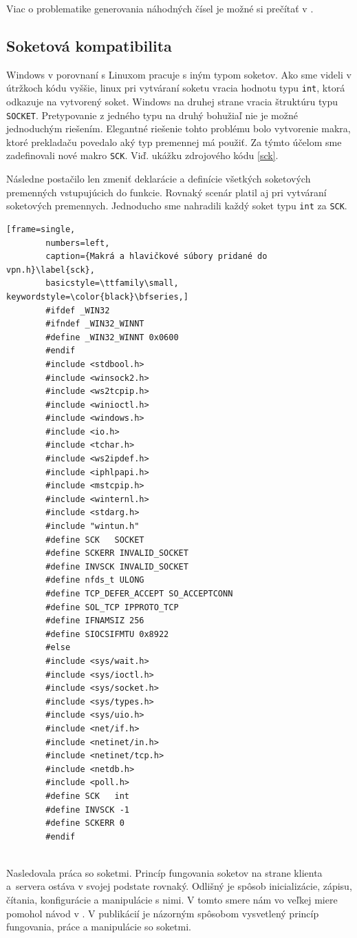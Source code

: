 Viac o problematike generovania náhodných čísel je možné si prečítať v \cite{bc}.
\subsection{Soketová kompatibilita}
Windows v porovnaní s Linuxom pracuje s iným typom soketov. Ako sme videli v útržkoch kódu vyššie, linux pri vytváraní soketu vracia hodnotu typu \lstinline|int|, ktorá odkazuje na vytvorený soket. Windows na druhej strane vracia štruktúru typu \lstinline|SOCKET|. Pretypovanie z jedného typu na druhý bohužiaľ nie je možné jednoduchým riešením. Elegantné riešenie tohto problému bolo vytvorenie makra, ktoré prekladaču povedalo aký typ premennej má použiť. Za týmto účelom sme zadefinovali nové makro \lstinline|SCK|. Viď. ukážku zdrojového kódu \ref{sck}.

Následne postačilo len zmeniť deklarácie a definície všetkých soketových premenných vstupujúcich do funkcie. Rovnaký scenár platil aj pri vytváraní soketových premennych. Jednoducho sme nahradili každý soket typu \lstinline|int| za \lstinline|SCK|.   

\begin{minipage}{\linewidth} 	
	\begin{lstlisting}[frame=single,
		numbers=left,
		caption={Makrá a hlavičkové súbory pridané do vpn.h}\label{sck},
		basicstyle=\ttfamily\small, keywordstyle=\color{black}\bfseries,]
		#ifdef _WIN32
		#ifndef _WIN32_WINNT
		#define _WIN32_WINNT 0x0600
		#endif
		#include <stdbool.h>
		#include <winsock2.h>
		#include <ws2tcpip.h>
		#include <winioctl.h>
		#include <windows.h>
		#include <io.h>
		#include <tchar.h>
		#include <ws2ipdef.h>
		#include <iphlpapi.h>
		#include <mstcpip.h>
		#include <winternl.h>
		#include <stdarg.h>
		#include "wintun.h"
		#define SCK   SOCKET
		#define SCKERR INVALID_SOCKET
		#define INVSCK INVALID_SOCKET
		#define nfds_t ULONG
		#define TCP_DEFER_ACCEPT SO_ACCEPTCONN
		#define SOL_TCP IPPROTO_TCP
		#define IFNAMSIZ 256
		#define SIOCSIFMTU 0x8922 
		#else
		#include <sys/wait.h>
		#include <sys/ioctl.h>
		#include <sys/socket.h>
		#include <sys/types.h>
		#include <sys/uio.h>
		#include <net/if.h>
		#include <netinet/in.h>
		#include <netinet/tcp.h>
		#include <netdb.h>
		#include <poll.h>
		#define SCK   int
		#define INVSCK -1
		#define SCKERR 0
		#endif
	\end{lstlisting}
\end{minipage}\\ 

Nasledovala práca so soketmi. Princíp fungovania soketov na strane klienta a~servera ostáva v svojej podstate rovnaký. Odlišný je spôsob inicializácie, zápisu, čítania, konfigurácie a manipulácie s nimi. V tomto smere nám vo veľkej miere pomohol návod v \cite{sck}. V publikácií je názorným spôsobom vysvetlený princíp fungovania, práce a manipulácie so soketmi. 

